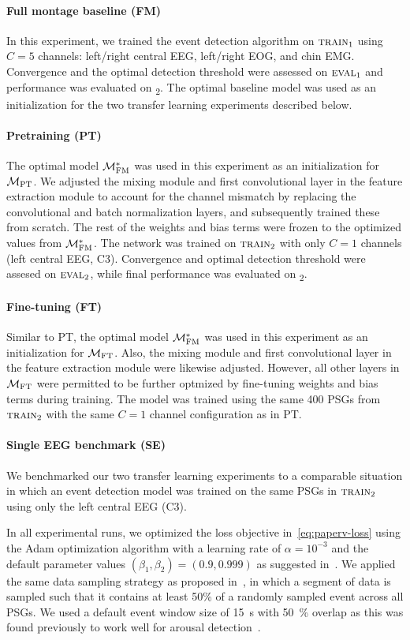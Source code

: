 \paragraph{Full montage baseline (FM)}
In this experiment, we trained the event detection algorithm on $\textsc{train}_1$ using \(C=5\) channels: left/right central EEG, left/right EOG, and chin EMG.
Convergence and the optimal detection threshold were assessed on $\textsc{eval}_1$ and performance was evaluated on \test\textsubscript{2}.
The optimal baseline model was used as an initialization for the two transfer learning experiments described below.
\paragraph{Pretraining (PT)}
The optimal model $\mathcal{M}_{\mathrm{FM}}^{*}$ was used in this experiment as an initialization for $\mathcal{M}_{\mathrm{PT}}$.
We adjusted the mixing module and first convolutional layer in the feature extraction module to account for the channel mismatch by replacing the convolutional and batch normalization layers, and subsequently trained these from scratch.
The rest of the weights and bias terms were frozen to the optimized values from $\mathcal{M}_{\mathrm{FM}}^{*}$.
The network was trained on $\textsc{train}_2$ with only $C=1$ channels (left central EEG, C3).
Convergence and optimal detection threshold were assesed on $\textsc{eval}_2$, while final performance was evaluated on \test\textsubscript{2}.
\paragraph{Fine-tuning (FT)}
Similar to PT, the optimal model $\mathcal{M}_{\mathrm{FM}}^{*}$ was used in this experiment as an initialization for $\mathcal{M}_{\mathrm{FT}}$.
Also, the mixing module and first convolutional layer in the feature extraction module were likewise adjusted.
However, all other layers in $\mathcal{M}_{\mathrm{FT}}$ were permitted to be further optmized by fine-tuning weights and bias terms during training.
The model was trained using the same 400 PSGs from $\textsc{train}_2$ with the same $C=1$ channel configuration as in PT.
\paragraph{Single EEG benchmark (SE)}
We benchmarked our two transfer learning experiments to a comparable situation in which an event detection model was trained on the same PSGs in $\textsc{train}_2$ using only the left central EEG (C3).



In all experimental runs, we optimized the loss objective in~\cref{eq:paperv-loss} using the Adam optimization algorithm with a learning rate of \(\alpha=10^{-3}\) and the default parameter values \( \left( \beta_1, \beta_2 \right) = \left( 0.9, 0.999 \right) \) as suggested in~\cite{Kingma2015}.
We applied the same data sampling strategy as proposed in~\cite{Olesen2019}, in which a segment of data is sampled such that it contains at least 50\% of a randomly sampled event across all PSGs.
We used a default event window size of \SI{15}{\second} with \SI{50}{\percent} overlap as this was found previously to work well for arousal detection~\cite{Olesen2019}.

